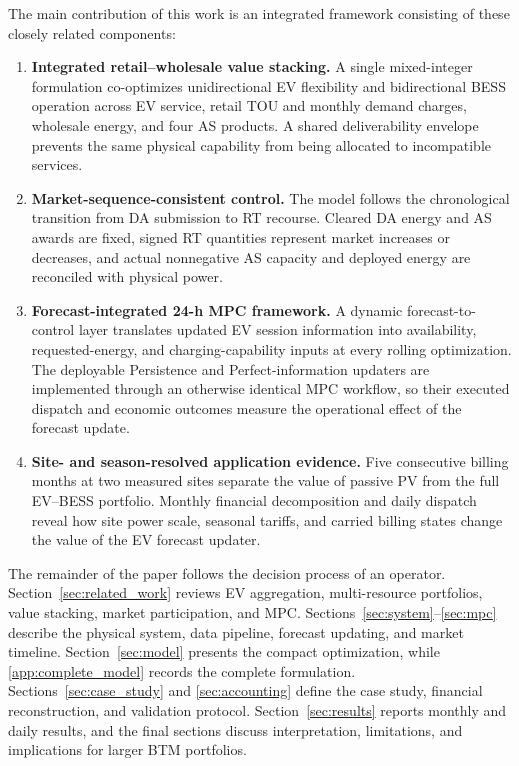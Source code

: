 \documentclass[final,5p,times]{elsarticle}
\begin{document}
The main contribution of this work is an integrated framework consisting of these closely related components:
\begin{enumerate}
  \item \textbf{Integrated retail--wholesale value stacking.} A single mixed-integer formulation co-optimizes unidirectional EV flexibility and bidirectional BESS operation across EV service, retail TOU and monthly demand charges, wholesale energy, and four AS products. A shared deliverability envelope prevents the same physical capability from being allocated to incompatible services.
  \item \textbf{Market-sequence-consistent control.} The model follows the chronological transition from DA submission to RT recourse. Cleared DA energy and AS awards are fixed, signed RT quantities represent market increases or decreases, and actual nonnegative AS capacity and deployed energy are reconciled with physical power.
  \item \textbf{Forecast-integrated 24-h MPC framework.} A dynamic forecast-to-control layer translates updated EV session information into availability, requested-energy, and charging-capability inputs at every rolling optimization. The deployable Persistence and Perfect-information updaters are implemented through an otherwise identical MPC workflow, so their executed dispatch and economic outcomes measure the operational effect of the forecast update.
  \item \textbf{Site- and season-resolved application evidence.} Five consecutive billing months at two measured sites separate the value of passive PV from the full EV--BESS portfolio. Monthly financial decomposition and daily dispatch reveal how site power scale, seasonal tariffs, and carried billing states change the value of the EV forecast updater.
  
\end{enumerate}

The remainder of the paper follows the decision process of an operator. Section~\ref{sec:related_work} reviews EV aggregation, multi-resource portfolios, value stacking, market participation, and MPC. Sections~\ref{sec:system}--\ref{sec:mpc} describe the physical system, data pipeline, forecast updating, and market timeline. Section~\ref{sec:model} presents the compact optimization, while \ref{app:complete_model} records the complete formulation. Sections~\ref{sec:case_study} and \ref{sec:accounting} define the case study, financial reconstruction, and validation protocol. Section~\ref{sec:results} reports monthly and daily results, and the final sections discuss interpretation, limitations, and implications for larger BTM portfolios.
\end{document}
